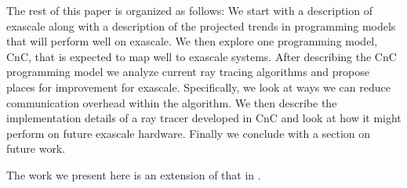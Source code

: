 The rest of this paper is organized as follows: We start with a description of exascale along with a description of the projected trends in programming models that will perform well on exascale.  We then explore one programming model, CnC, that is expected to map well to exascale systems.  After describing the CnC programming model we analyze current ray tracing algorithms and propose places for improvement for exascale.  Specifically, we look at ways we can reduce communication overhead within the algorithm.  We then describe the implementation details of a ray tracer developed in CnC and look at how it might perform on future exascale hardware.  Finally we conclude with a section on future work.

The work we present here is an extension of that in \cite{porter2014cnc}.


